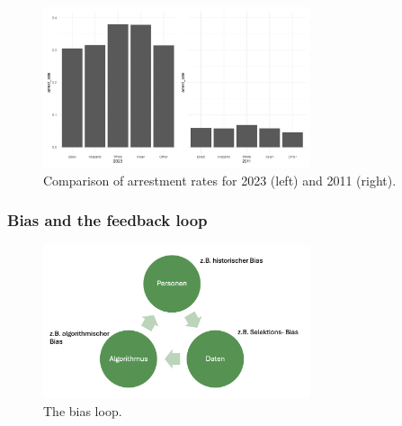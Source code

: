 \begin{figure}
    \centering
    \includegraphics[width=0.7\textwidth]{../figures/sqf_case_study_plot10.png}
    \caption{Comparison of arrestment rates for 2023 (left) and 2011 (right).}
    \label{fig:arrestment_rates_clean_data}
\end{figure}




\subsubsection*{Bias and the feedback loop}
\begin{figure}
    \centering
    \includegraphics[width=0.7\textwidth]{../figures/bias_loop.png}
    \caption{The bias loop.}
    \label{fig:bias_loop}
\end{figure}

